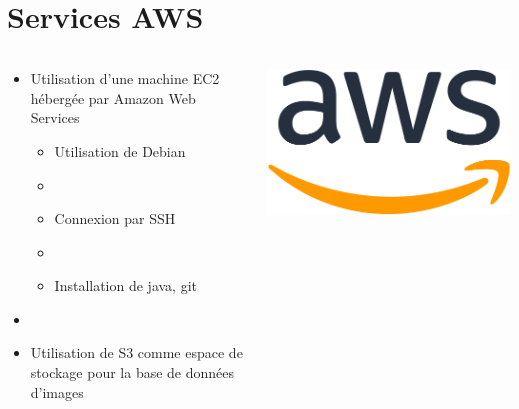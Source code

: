 \documentclass[8pt,aspectratio=169,hyperref={unicode=true}]{beamer}
\begin{document}
\section{Services AWS}
\begin{frame}{\insertsection}
  \begin{columns}
    \begin{column}{.6\textwidth}
      \begin{itemize}
        \item Utilisation d'une machine EC2 hébergée par Amazon Web Services
              \begin{itemize}
                \item Utilisation de Debian
                \item[]
                \item Connexion par SSH
                \item[]
                \item Installation de java, git
              \end{itemize}
        \item[]
        \item Utilisation de S3 comme espace de stockage pour la base de données d'images
      \end{itemize}
    \end{column}
    \begin{column}{.4\textwidth}
      \center
      \includegraphics[width=.8\textwidth]{./512px-Amazon_Web_Services_Logo.svg.png}
    \end{column}
  \end{columns}
\end{frame}
\end{document}
